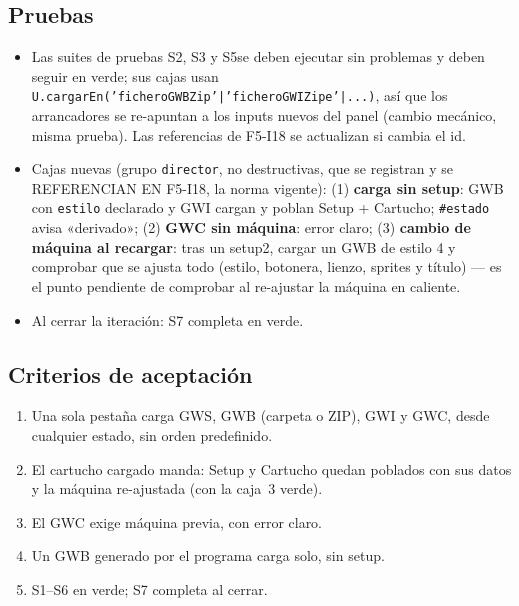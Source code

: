 \subsection{Pruebas}
\label{sec:F5I19Pruebas}

\begin{itemize}
	\item Las suites de pruebas S2, S3 y S5se deben ejecutar sin problemas y deben seguir en verde; sus cajas usan
	\texttt{U.cargarEn('ficheroGWBZip'|'ficheroGWIZipe'|...)}, así que los
	arrancadores se re-apuntan a los inputs nuevos del panel (cambio
	mecánico, misma prueba). Las referencias de F5-I18 se actualizan si
	cambia el id.
	\item Cajas nuevas (grupo \texttt{director}, no destructivas, que se
	registran y se REFERENCIAN EN F5-I18, la norma vigente):
	(1) \textbf{carga sin setup}: GWB con \texttt{estilo} declarado y GWI
	cargan y poblan Setup + Cartucho; \texttt{\#estado} avisa «derivado»;
	(2) \textbf{GWC sin máquina}: error claro; (3) \textbf{cambio de
		máquina al recargar}: tras un setup2, cargar un GWB de estilo 4 y
	comprobar que se ajusta todo (estilo, botonera, lienzo, sprites y
	título) — es el punto pendiente de comprobar al re-ajustar la máquina
	en caliente.
	\item Al cerrar la iteración: S7 completa en verde.
\end{itemize}

\subsection{Criterios de aceptación}
\label{sec:F5I19Criterios}

\begin{enumerate}
	\item Una sola pestaña carga GWS, GWB (carpeta o ZIP), GWI y GWC, desde
	cualquier estado, sin orden predefinido.
	\item El cartucho cargado manda: Setup y Cartucho quedan poblados con
	sus datos y la máquina re-ajustada (con la caja~3 verde).
	\item El GWC exige máquina previa, con error claro.
	\item Un GWB generado por el programa carga solo, sin setup.
	\item S1--S6 en verde; S7 completa al cerrar.
\end{enumerate}